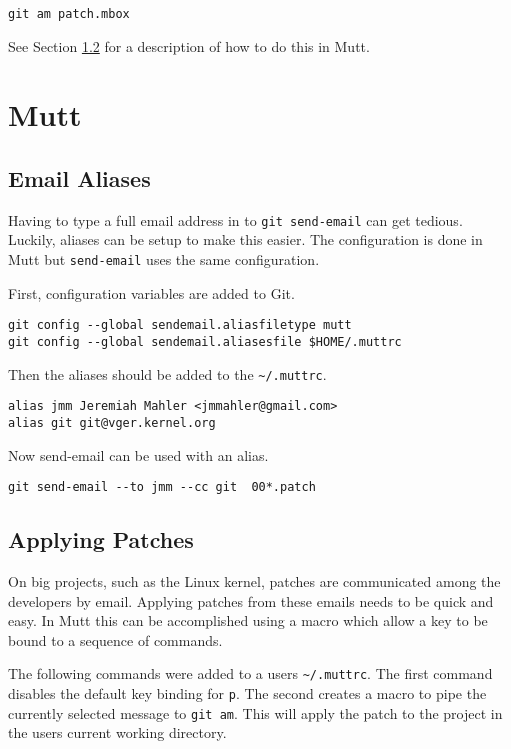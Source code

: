 \documentclass{article}
\begin{document}
\begin{verbatim}
git am patch.mbox
\end{verbatim}

See Section \ref{sec:mutt-apply-patch} for a description of how to do
this in Mutt.

\section{Mutt}

\subsection{Email Aliases}
\label{sec:mutt-aliases}

Having to type a full email address in to \verb+git send-email+ can get
tedious.  Luckily, aliases can be setup to make this easier.  The
configuration is done in Mutt but \verb+send-email+ uses the same
configuration.

First, configuration variables are added to Git.

\begin{verbatim}
git config --global sendemail.aliasfiletype mutt
git config --global sendemail.aliasesfile $HOME/.muttrc
\end{verbatim}

Then the aliases should be added to the \verb+~/.muttrc+.

\begin{verbatim}
alias jmm Jeremiah Mahler <jmmahler@gmail.com>
alias git git@vger.kernel.org
\end{verbatim}

Now send-email can be used with an alias.

\begin{verbatim}
git send-email --to jmm --cc git  00*.patch
\end{verbatim}

\subsection{Applying Patches}
\label{sec:mutt-apply-patch}

On big projects, such as the Linux kernel, patches are communicated
among the developers by email.  Applying patches from these emails needs
to be quick and easy.  In Mutt this can be accomplished using a macro
which allow a key to be bound to a sequence of commands.

The following commands were added to a users \verb+~/.muttrc+.  The first
command disables the default key binding for \verb+p+.  The second creates a
macro to pipe the currently selected message to \verb+git am+.  This will
apply the patch to the project in the users current working directory.
\end{document}
